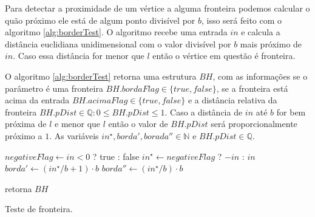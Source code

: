Para detectar a proximidade de um vértice a alguma fronteira podemos calcular o 
quão próximo ele está de algum ponto divisível por $b$, isso será feito com 
o algoritmo \ref{alg:borderTest}. O algoritmo recebe uma entrada $in$ e calcula
a distância euclidiana unidimensional com o valor divisível por $b$ mais próximo 
de $in$. Caso essa distância for menor que $l$ então o vértice em questão é 
fronteira.

O algoritmo \ref{alg:borderTest} retorna uma estrutura $BH$, com as informações
se o parâmetro é uma fronteira $BH.bordaFlag \in \{true, false\}$, se a fronteira 
está acima da entrada $BH.acimaFlag \in \{true, false\}$ e a distância relativa 
da fronteira $BH.pDist \in \mathbb{Q}: 0 \leq BH.pDist \leq 1$. Caso a distância de $in$ até $b$ for bem 
próxima de $l$ e menor que $l$ então o valor de $BH.pDist$ será proporcionalmente
próximo a $1$. As variáveis
$in^{\star}, borda', borada'' \in \mathbb{N}$ e $BH.pDist \in \mathbb{Q}$.

\begin{algorithm}[H]\label{alg:borderTest}%
    $negativeFlag \leftarrow in < 0$ ? true : false\;
    $in^{\star} \leftarrow negativeFlag$ ? $-in$ : $in$\;
    $borda' \leftarrow (in^{\star}/b +1) \cdot b$\;
    $borda'' \leftarrow (in^{\star}/b) \cdot b$\;
    
    retorna $BH$\;
    \caption{Teste de fronteira.}
\end{algorithm}

